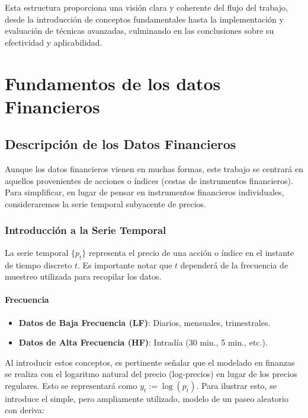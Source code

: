 \documentclass[a4paper,12pt, twoside]{report}
\begin{document}
Esta estructura proporciona una visión clara y coherente del flujo del trabajo, desde la introducción de conceptos fundamentales hasta la implementación y evaluación de técnicas avanzadas, culminando en las conclusiones sobre su efectividad y aplicabilidad.


\chapter{Fundamentos de los datos Financieros}
\section{Descripción de los Datos Financieros}

Aunque los datos financieros vienen en muchas formas, este trabajo se centrará en aquellos provenientes de acciones o índices 
(cestas de instrumentos financieros). Para simplificar, en lugar de pensar en instrumentos financieros individuales, consideraremos 
la serie temporal subyacente de precios.

\subsection{Introducción a la Serie Temporal}

La serie temporal $\{p_t\}$ representa el precio de una acción o índice en el instante de tiempo discreto $t$. Es importante 
notar que $t$ dependerá de la frecuencia de muestreo utilizada para recopilar los datos.

\subsubsection{Frecuencia}

\begin{itemize}
    \item \textbf{Datos de Baja Frecuencia (LF)}: Diarios, mensuales, trimestrales.
    \item \textbf{Datos de Alta Frecuencia (HF)}: Intradía (30 min., 5 min., etc.).
\end{itemize}

Al introducir estos conceptos, es pertinente señalar que el modelado en finanzas se realiza con el logaritmo natural del precio 
(log-precios) en lugar de los precios regulares. Esto se representará como $y_t := \log(p_t)$. Para ilustrar esto, se 
introduce el simple, pero ampliamente utilizado, modelo de un paseo aleatorio con deriva:
\end{document}
